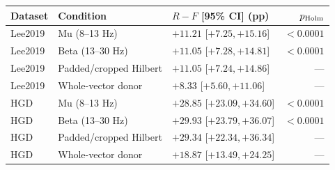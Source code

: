 \begin{tabular}{@{}lllr@{}}
\toprule
Dataset & Condition & $R-F$ [95\% CI] (pp) & $p_{\rm Holm}$ \\
\midrule
Lee2019 & Mu (8--13 Hz) & $+11.21$ [$ +7.25, +15.16 $] & $<0.0001$ \\
Lee2019 & Beta (13--30 Hz) & $+11.05$ [$ +7.28, +14.81 $] & $<0.0001$ \\
Lee2019 & Padded/cropped Hilbert & $+11.05$ [$ +7.24, +14.86 $] & --- \\
Lee2019 & Whole-vector donor & $+8.33$ [$ +5.60, +11.06 $] & --- \\
HGD & Mu (8--13 Hz) & $+28.85$ [$ +23.09, +34.60 $] & $<0.0001$ \\
HGD & Beta (13--30 Hz) & $+29.93$ [$ +23.79, +36.07 $] & $<0.0001$ \\
HGD & Padded/cropped Hilbert & $+29.34$ [$ +22.34, +36.34 $] & --- \\
HGD & Whole-vector donor & $+18.87$ [$ +13.49, +24.25 $] & --- \\
\bottomrule
\end{tabular}
